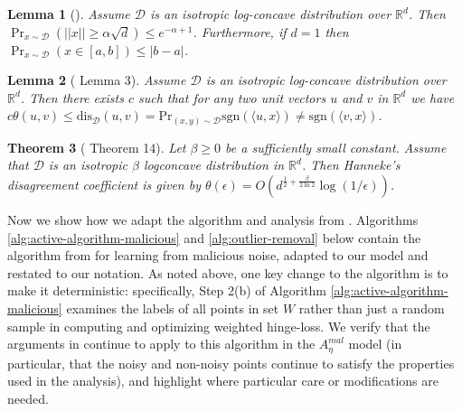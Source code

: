 \documentclass[11pt]{article}
\newtheorem{theorem}{Theorem}[section]
\newtheorem{lemma}[theorem]{Lemma}
\newcommand{\R}{\mathbb{R}}
\newcommand{\0}{\mathbf{0}}
\newcommand{\1}{\mathbf{1}}
\newcommand{\cD}{\mathcal{D}}
\begin{document}
\begin{lemma}[\cite{lovasz2007geometry}]
Assume $\cD$ is an isotropic log-concave distribution over $\R^d$. Then $\Pr_{x \sim \cD}(||x|| \geq \alpha\sqrt{d}) \leq e^{-\alpha+1}$.  Furthermore, if $d=1$ then $\Pr_{x \sim \cD}(x \in [a,b]) \leq |b-a|$.
\label{lem:isotropic_facts}
\end{lemma}

\begin{lemma}[\cite{balcan2013active} Lemma 3] Assume $\cD$ is an isotropic log-concave distribution over $\R^d$. Then there exists $c$ such that for any two
unit vectors $u$ and $v$ in $\R^d$ we have
$c\theta(u, v) \le \text{dis}_{\cD}(u, v)=\text{Pr}_{(x,y)\sim\cD}\text{sgn}(\langle u,x\rangle)\ne\text{sgn}(\langle v,x\rangle)$.
\label{lem:ilc-angle}
\end{lemma}



\begin{theorem}[\cite{balcan2013active} Theorem 14] Let $\beta\ge0$ be a sufficiently small constant. Assume that $\cD$ is an isotropic $\beta$ logconcave distribution in $\R^d$. Then Hanneke's disagreement coefficient \cite{hanneke2007bound} is given by $\theta(\epsilon)=O(d^{\frac{1}{2}+\frac{\beta}{2\ln 2}}\log(1/\epsilon))$.
\label{thm:logconcave-isotropic-disagreement-coefficient}
\end{theorem}

Now we show how we adapt the algorithm and analysis from \cite{awasthi2017power}.
Algorithms \ref{alg:active-algorithm-malicious} and \ref{alg:outlier-removal} below contain the algorithm from \cite{awasthi2017power} for learning from malicious noise, adapted to our model and restated to our notation.   As noted above, one key change to the algorithm is to make it deterministic: specifically, Step 2(b) of Algorithm  \ref{alg:active-algorithm-malicious} examines the labels of all points in set $W$ rather than just a random sample in computing and optimizing weighted hinge-loss.  We verify that the arguments in  \cite{awasthi2017power} continue to apply to this algorithm in the $A^{mal}_\eta$ model (in particular, that the noisy and non-noisy points continue to satisfy the properties used in the analysis), and highlight where particular care or modifications are needed.
\end{document}
